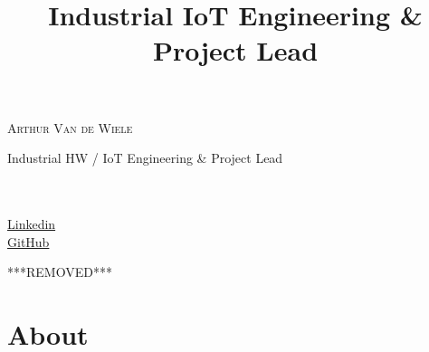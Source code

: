 \documentclass[10pt,a4paper]{moderncv}
\title{Industrial IoT Engineering \& Project Lead}
\newcommand*{\makenameplate}[0]{
  {\color{color1}\Huge\scshape\mdseries Arthur Van de Wiele}
  \vspace{0.5em}
  {\par\color{color2}\Large Industrial HW / IoT Engineering \& Project Lead}
}
\begin{document}
\begin{minipage}{0.70\textwidth}
  \makenameplate
\end{minipage}
\begin{minipage}{0.30\textwidth}
  \emailsymbol\hspace{1em} \\
  \mobilephonesymbol\hspace{1em }\\
  \faLinkedin\hspace{1em} \href{https://www.linkedin.com/in/arthur-van-de-wiele/}{Linkedin}\\
  \faGithubSquare\hspace{1em} \href{https://www.linkedin.com/in/arthur-van-de-wiele/}{GitHub}
\end{minipage}

\vspace{1em}
{\par\color{color2}***REMOVED***}

\vspace{2em}

\section{About}
\end{document}

